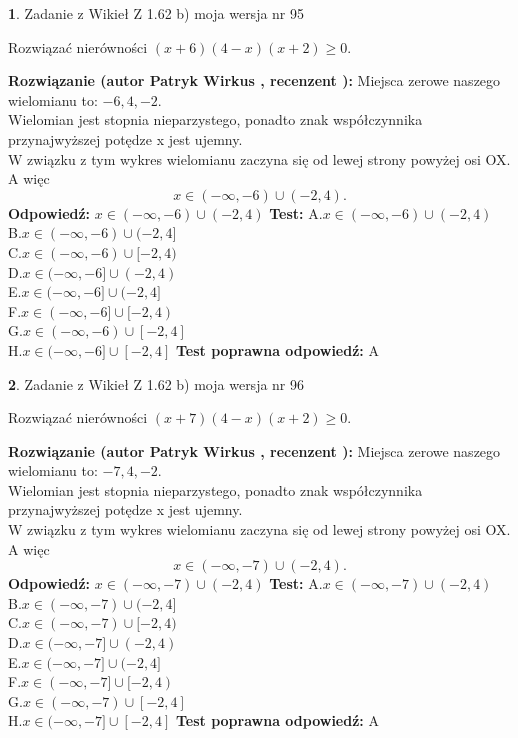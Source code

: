\documentclass[12pt, a4paper]{article}
\theoremstyle{definition} %
\newtheorem{zad}{}
\newcommand{\zadStart}[1]{\begin{zad}#1\newline}
\newcommand{\zadStop}{\end{zad}}
\newcommand{\rozwStart}[2]{\noindent \textbf{Rozwiązanie (autor #1 , recenzent #2): }\newline}
\newcommand{\rozwStop}{\newline}
\newcommand{\odpStart}{\noindent \textbf{Odpowiedź:}\newline}
\newcommand{\odpStop}{\newline}
\newcommand{\testStart}{\noindent \textbf{Test:}\newline}
\newcommand{\testStop}{\newline}
\newcommand{\kluczStart}{\noindent \textbf{Test poprawna odpowiedź:}\newline}
\newcommand{\kluczStop}{\newline}
\begin{document}
\zadStart{Zadanie z Wikieł Z 1.62 b) moja wersja nr 95}

Rozwiązać nierówności $(x+6)(4-x)(x+2)\ge0$.
\zadStop
\rozwStart{Patryk Wirkus}{}
Miejsca zerowe naszego wielomianu to: $-6, 4, -2$.\\
Wielomian jest stopnia nieparzystego, ponadto znak współczynnika przy\linebreak najwyższej potędze x jest ujemny.\\ W związku z tym wykres wielomianu zaczyna się od lewej strony powyżej osi OX. A więc $$x \in (-\infty,-6) \cup (-2,4).$$
\rozwStop
\odpStart
$x \in (-\infty,-6) \cup (-2,4)$
\odpStop
\testStart
A.$x \in (-\infty,-6) \cup (-2,4)$\\
B.$x \in (-\infty,-6) \cup (-2,4]$\\
C.$x \in (-\infty,-6) \cup [-2,4)$\\
D.$x \in (-\infty,-6] \cup (-2,4)$\\
E.$x \in (-\infty,-6] \cup (-2,4]$\\
F.$x \in (-\infty,-6] \cup [-2,4)$\\
G.$x \in (-\infty,-6) \cup [-2,4]$\\
H.$x \in (-\infty,-6] \cup [-2,4]$
\testStop
\kluczStart
A
\kluczStop



\zadStart{Zadanie z Wikieł Z 1.62 b) moja wersja nr 96}

Rozwiązać nierówności $(x+7)(4-x)(x+2)\ge0$.
\zadStop
\rozwStart{Patryk Wirkus}{}
Miejsca zerowe naszego wielomianu to: $-7, 4, -2$.\\
Wielomian jest stopnia nieparzystego, ponadto znak współczynnika przy\linebreak najwyższej potędze x jest ujemny.\\ W związku z tym wykres wielomianu zaczyna się od lewej strony powyżej osi OX. A więc $$x \in (-\infty,-7) \cup (-2,4).$$
\rozwStop
\odpStart
$x \in (-\infty,-7) \cup (-2,4)$
\odpStop
\testStart
A.$x \in (-\infty,-7) \cup (-2,4)$\\
B.$x \in (-\infty,-7) \cup (-2,4]$\\
C.$x \in (-\infty,-7) \cup [-2,4)$\\
D.$x \in (-\infty,-7] \cup (-2,4)$\\
E.$x \in (-\infty,-7] \cup (-2,4]$\\
F.$x \in (-\infty,-7] \cup [-2,4)$\\
G.$x \in (-\infty,-7) \cup [-2,4]$\\
H.$x \in (-\infty,-7] \cup [-2,4]$
\testStop
\kluczStart
A
\kluczStop
\end{document}
